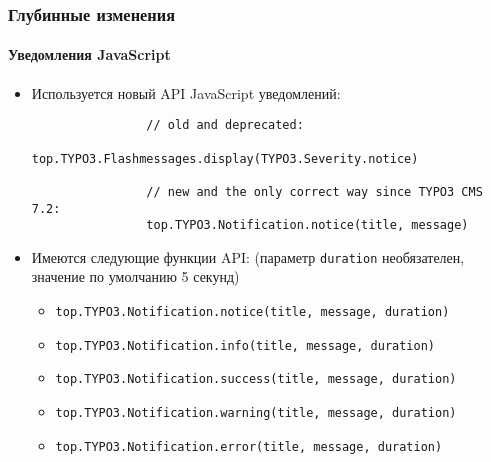 \begin{frame}[fragile]
	\frametitle{Глубинные изменения}
	\framesubtitle{Уведомления JavaScript}

	\begin{itemize}

		\item Используется новый API JavaScript уведомлений:
			\begin{lstlisting}
				// old and deprecated:
				top.TYPO3.Flashmessages.display(TYPO3.Severity.notice)

				// new and the only correct way since TYPO3 CMS 7.2:
				top.TYPO3.Notification.notice(title, message)
    		\end{lstlisting}

		\item Имеются следующие функции API:\newline
			\small(параметр \texttt{duration} необязателен, значение по умолчанию 5 секунд)\normalsize
			\begin{itemize}
				\item \normalsize\smaller\texttt{top.TYPO3.Notification.notice(title, message, duration)}\normalsize
				\item \smaller\texttt{top.TYPO3.Notification.info(title, message, duration)}\normalsize
				\item \smaller\texttt{top.TYPO3.Notification.success(title, message, duration)}\normalsize
				\item \smaller\texttt{top.TYPO3.Notification.warning(title, message, duration)}\normalsize
				\item \smaller\texttt{top.TYPO3.Notification.error(title, message, duration)}\normalsize
			\end{itemize}

	\end{itemize}

\end{frame}

